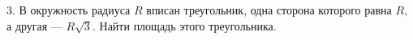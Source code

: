 3. В окружность радиуса $R$ вписан треугольник, одна сторона которого равна $R,$ а другая --- $R\sqrt{3}.$ Найти площадь этого треугольника.\\
